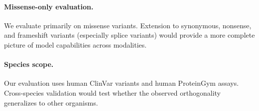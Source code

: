 \documentclass[9pt]{article}
\begin{document}
\paragraph{Missense-only evaluation.} We evaluate primarily on missense variants. Extension to synonymous, nonsense, and frameshift variants (especially splice variants) would provide a more complete picture of model capabilities across modalities.

\paragraph{Species scope.} Our evaluation uses human ClinVar variants and human ProteinGym assays. Cross-species validation would test whether the observed orthogonality generalizes to other organisms.



\end{document}
